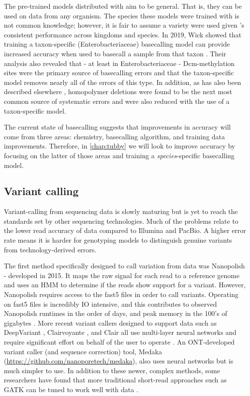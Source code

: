 \noindent
The pre-trained models distributed with \guppy{} aim to be general. That is, they can be used on \ont{} data from any organism. The species these models were trained with is not common knowledge; however, it is fair to assume a variety were used given \guppy{}'s consistent performance across kingdoms and species. In 2019, Wick \etal{} showed that training a taxon-specific (Enterobacteriaceae) basecalling model can provide increased accuracy when used to basecall a sample from that taxon \cite{wick2019}. Their analysis also revealed that - at least in Enterobacteriaceae - Dcm-methylation sites were the primary source of \guppy{} basecalling errors and that the taxon-specific model removes nearly all of the errors of this type. In addition, as has also been described elsewhere \cite{watson2019}, homopolymer deletions were found to be the next most common source of systematic errors and were also reduced with the use of a taxon-specific model.

The current state of \ont{} basecalling suggests that improvements in accuracy will come from three areas: chemistry, basecalling algorithm, and training data improvements. Therefore, in \autoref{chap:tubby} we will look to improve \ont{} accuracy by focusing on the latter of those areas and training a \emph{species}-specific basecalling model.

\subsection{Variant calling}
\label{sec:ont-var-calling-intro}

Variant-calling from \ont{} sequencing data is slowly maturing but is yet to reach the standards set by other sequencing technologies. Much of the problems relate to the lower read accuracy of \ont{} data compared to Illumina and PacBio. A higher error rate means it is harder for genotyping models to distinguish genuine variants from technology-derived errors.

The first method specifically designed to call variation from \ont{} data was Nanopolish \cite{nanopolish2015,nanopolish2017} - developed in 2015. It maps the raw signal for each read to a reference genome and uses an HMM to determine if the reads show support for a variant. However, Nanopolish requires access to the fast5 files in order to call variants. Operating on fast5 files is incredibly IO intensive, and this contributes to observed Nanopolish runtimes in the order of days, and peak memory in the 100's of gigabytes \cite{clairvoyant2019}. More recent variant callers designed to support \ont{} data such as DeepVariant \cite{deepvariant}, Clairvoyante \cite{clairvoyant2019}, and Clair \cite{clair2020} all use multi-layer neural networks and require significant effort on behalf of the user to operate \cite{sanderson2020}. An ONT-developed variant caller (and sequence correction) tool, Medaka (\url{https://github.com/nanoporetech/medaka}), also uses neural networks but is much simpler to use. In addition to these newer, complex methods, some researchers have found that more traditional short-read approaches such as GATK \cite{Poplin2018} can be tuned to work well with \ont{} data \cite{greig2021,bainomugisa2018,Greig2019}.

